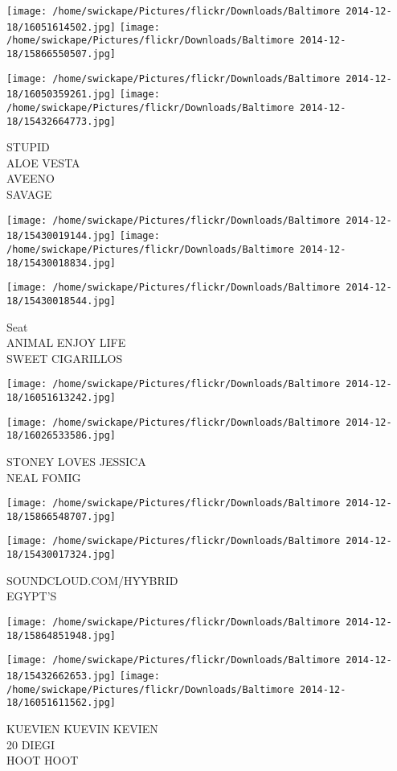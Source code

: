 \documentclass[10pt,letterpaper]{article}
\begin{document}
\texttt{[image: /home/swickape/Pictures/flickr/Downloads/Baltimore 2014-12-18/16051614502.jpg]}
\texttt{[image: /home/swickape/Pictures/flickr/Downloads/Baltimore 2014-12-18/15866550507.jpg]}

\texttt{[image: /home/swickape/Pictures/flickr/Downloads/Baltimore 2014-12-18/16050359261.jpg]}
\texttt{[image: /home/swickape/Pictures/flickr/Downloads/Baltimore 2014-12-18/15432664773.jpg]}

STUPID\\
ALOE VESTA\\
AVEENO\\
SAVAGE\\
\pagebreak

\texttt{[image: /home/swickape/Pictures/flickr/Downloads/Baltimore 2014-12-18/15430019144.jpg]}
\texttt{[image: /home/swickape/Pictures/flickr/Downloads/Baltimore 2014-12-18/15430018834.jpg]}

\texttt{[image: /home/swickape/Pictures/flickr/Downloads/Baltimore 2014-12-18/15430018544.jpg]}

Seat\\
ANIMAL ENJOY LIFE\\
SWEET CIGARILLOS\\
\pagebreak

\texttt{[image: /home/swickape/Pictures/flickr/Downloads/Baltimore 2014-12-18/16051613242.jpg]}

\vspace{0.25in}
\texttt{[image: /home/swickape/Pictures/flickr/Downloads/Baltimore 2014-12-18/16026533586.jpg]}

STONEY LOVES JESSICA\\
NEAL FOMIG\\
\pagebreak

\texttt{[image: /home/swickape/Pictures/flickr/Downloads/Baltimore 2014-12-18/15866548707.jpg]}

\vspace{0.25in}
\texttt{[image: /home/swickape/Pictures/flickr/Downloads/Baltimore 2014-12-18/15430017324.jpg]}

SOUNDCLOUD.COM/HYYBRID\\
EGYPT'S\\
\pagebreak

\texttt{[image: /home/swickape/Pictures/flickr/Downloads/Baltimore 2014-12-18/15864851948.jpg]}

\vspace{0.25in}
\texttt{[image: /home/swickape/Pictures/flickr/Downloads/Baltimore 2014-12-18/15432662653.jpg]}
\texttt{[image: /home/swickape/Pictures/flickr/Downloads/Baltimore 2014-12-18/16051611562.jpg]}

KUEVIEN KUEVIN KEVIEN\\
20 DIEGI\\
HOOT HOOT\\
\pagebreak
\end{document}
